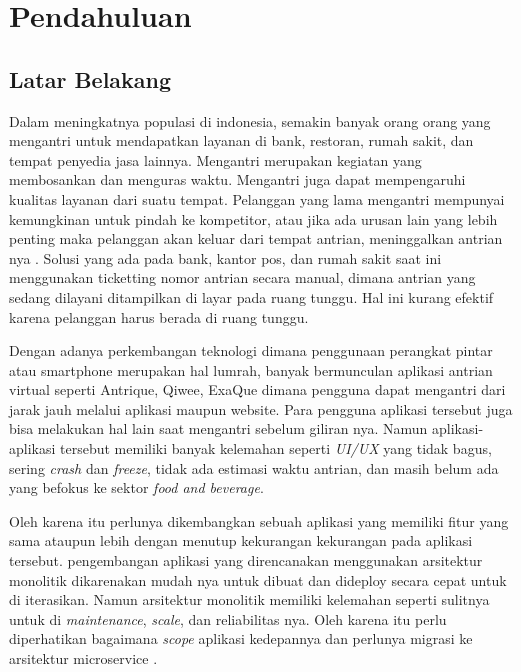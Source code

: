 \chapter{Pendahuluan}

\section{Latar Belakang}
Dalam meningkatnya populasi di indonesia, semakin banyak orang orang yang mengantri untuk mendapatkan layanan di bank, restoran, rumah sakit, dan tempat penyedia jasa lainnya. Mengantri merupakan kegiatan yang membosankan dan menguras waktu. Mengantri juga dapat mempengaruhi kualitas layanan dari suatu tempat. Pelanggan yang lama mengantri mempunyai kemungkinan untuk pindah ke kompetitor, atau jika ada urusan lain yang lebih penting maka pelanggan akan keluar dari tempat antrian, meninggalkan antrian nya \cite{khong2017queue}\cite{Ghazal2016}\cite{Uddin2016}. Solusi yang ada pada bank, kantor pos, dan rumah sakit saat ini menggunakan ticketting nomor antrian secara manual, dimana antrian yang sedang dilayani ditampilkan di layar pada ruang tunggu. Hal ini kurang efektif karena pelanggan harus berada di ruang tunggu\cite{Ghazal2016}.

Dengan adanya perkembangan teknologi dimana penggunaan perangkat pintar atau smartphone merupakan hal lumrah, banyak bermunculan aplikasi antrian virtual seperti Antrique, Qiwee, ExaQue dimana pengguna dapat mengantri dari jarak jauh melalui aplikasi maupun website. Para pengguna aplikasi tersebut juga bisa melakukan hal lain saat mengantri sebelum giliran nya. Namun aplikasi-aplikasi tersebut memiliki banyak kelemahan seperti \textit{UI/UX} yang tidak bagus, sering \textit{crash} dan \textit{freeze}, tidak ada estimasi waktu antrian, dan masih belum ada yang befokus ke sektor \textit{food and beverage}.

Oleh karena itu perlunya dikembangkan sebuah aplikasi yang memiliki fitur yang sama ataupun lebih dengan menutup kekurangan kekurangan pada aplikasi tersebut. pengembangan aplikasi yang direncanakan menggunakan arsitektur monolitik dikarenakan mudah nya untuk dibuat dan dideploy secara cepat untuk di iterasikan. Namun arsitektur monolitik memiliki kelemahan seperti sulitnya untuk di \textit{maintenance}, \textit{scale}, dan reliabilitas nya. Oleh karena itu perlu diperhatikan bagaimana \textit{scope} aplikasi kedepannya dan perlunya migrasi ke arsitektur microservice \cite{gos2020comparison} \cite{jatkiewicz2023differences}.

